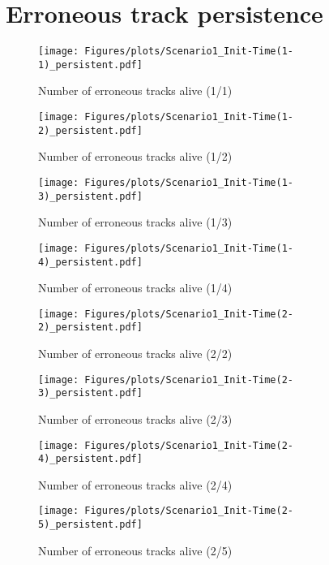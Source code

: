 
\chapter{Erroneous track persistence}

\begin{figure}[H]
\centering
\texttt{[image: Figures/plots/Scenario1\_Init-Time(1-1)\_persistent.pdf]}
\caption{Number of erroneous tracks alive (1/1)}\label{fig:init_time_1-1_persistent}
\end{figure}

\begin{figure}
\centering
\texttt{[image: Figures/plots/Scenario1\_Init-Time(1-2)\_persistent.pdf]}
\caption{Number of erroneous tracks alive (1/2)}\label{fig:init_time_1-2_persistent}
\end{figure}

\begin{figure}
\centering
\texttt{[image: Figures/plots/Scenario1\_Init-Time(1-3)\_persistent.pdf]}
\caption{Number of erroneous tracks alive (1/3)}\label{fig:init_time_1-3_persistent}
\end{figure}

\begin{figure}
\centering
\texttt{[image: Figures/plots/Scenario1\_Init-Time(1-4)\_persistent.pdf]}
\caption{Number of erroneous tracks alive (1/4)}\label{fig:init_time_1-4_persistent}
\end{figure}

\begin{figure}
\centering
\texttt{[image: Figures/plots/Scenario1\_Init-Time(2-2)\_persistent.pdf]}
\caption{Number of erroneous tracks alive (2/2)}\label{fig:init_time_2-2_persistent}

\texttt{[image: Figures/plots/Scenario1\_Init-Time(2-3)\_persistent.pdf]}
\caption{Number of erroneous tracks alive (2/3)}\label{fig:init_time_2-3_persistent}
\end{figure}

\begin{figure}
\centering
\texttt{[image: Figures/plots/Scenario1\_Init-Time(2-4)\_persistent.pdf]}
\caption{Number of erroneous tracks alive (2/4)}\label{fig:init_time_2-4_persistent}

\texttt{[image: Figures/plots/Scenario1\_Init-Time(2-5)\_persistent.pdf]}
\caption{Number of erroneous tracks alive (2/5)}\label{fig:init_time_2-5_persistent}
\end{figure}

